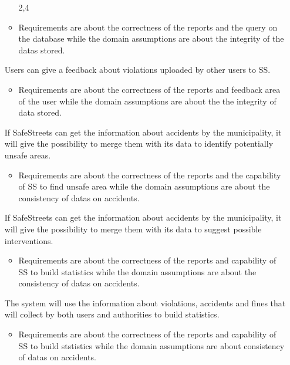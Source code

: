 \documentclass[../RASD.tex]{subfiles}
\begin{document}
\begin{enumerate}
\begin{itemize}
                        \assumption{} 2,4
                        \item Requirements are about the correctness of the reports and the query on the database while the domain assumptions are about the integrity of the datas stored.
                    \end{itemize}
                     Users can give a feedback about violations uploaded by other users to SS.
                    \begin{itemize}
                        \requirement{} 1,2,3,4,5,6,7,8,23,22,24
                        \assumption{} 2,4
                        \item Requirements are about the correctness of the reports and feedback area of the user while the domain assumptions are about the the integrity of data stored.
                    \end{itemize}
                     If SafeStreets can get the information about accidents by the municipality, it will give the possibility to merge them with its data to identify potentially unsafe areas.
                    \begin{itemize}
                        \requirement{} 7,8,13,16,17,18,19,22,29
                        \assumption{} 3,5
                        \item Requirements are about the correctness of the reports and the capability of SS to find unsafe area while the domain assumptions are about the consistency of datas on accidents.
                    \end{itemize}
                     If SafeStreets can get the information about accidents by the municipality, it will give the possibility to merge them with its data to suggest possible interventions.
                    \begin{itemize}
                        \requirement{} 5,6,7,8,17,18,19,20,22,25,29
                        \assumption{} 3,5
                        \item Requirements are about the correctness of the reports and capability of SS to build statistics while the domain assumptions are about the consistency of datas on accidents.
                    \end{itemize}
                     The system will use the information about violations, accidents and fines that will collect by both users and authorities to build statistics.
                    \begin{itemize}
                        \requirement{} 5,6,7,8,17,18,19,23,24,22,27,29
                        \assumption{} 2,5
                        \item Requirements are about the correctness of the reports and capability of SS to build ststistics while the domain assumptions are about consistency of datas on accidents.
                    \end{itemize}\end{enumerate}
\end{document}

